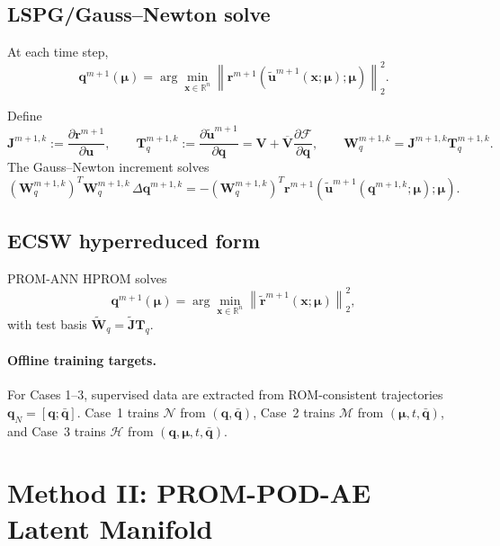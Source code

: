 \documentclass[11pt]{article}
\begin{document}
\subsection{LSPG/Gauss--Newton solve}
At each time step,
\begin{equation}
\mathbf q^{m+1}(\bm\mu)
=
\arg\min_{\mathbf x\in\mathbb R^n}
\left\|
\mathbf r^{m+1}(\tilde{\mathbf u}^{m+1}(\mathbf x;\bm\mu);\bm\mu)
\right\|_2^2.
\label{eq:ann-lspg-min}
\end{equation}

Define
\begin{equation}
\mathbf J^{m+1,k}:=\frac{\partial \mathbf r^{m+1}}{\partial \mathbf u},
\qquad
\mathbf T_q^{m+1,k}:=\frac{\partial \tilde{\mathbf u}^{m+1}}{\partial \mathbf q}
=\mathbf V+\overline{\mathbf V}\frac{\partial\mathcal F}{\partial\mathbf q},
\qquad
\mathbf W_q^{m+1,k}=\mathbf J^{m+1,k}\mathbf T_q^{m+1,k}.
\end{equation}
The Gauss--Newton increment solves
\begin{equation}
(\mathbf W_q^{m+1,k})^T\mathbf W_q^{m+1,k}\,\Delta\mathbf q^{m+1,k}
=
-(\mathbf W_q^{m+1,k})^T
\mathbf r^{m+1}(\tilde{\mathbf u}^{m+1}(\mathbf q^{m+1,k};\bm\mu);\bm\mu).
\end{equation}

\subsection{ECSW hyperreduced form}
PROM-ANN HPROM solves
\begin{equation}
\mathbf q^{m+1}(\bm\mu)
=
\arg\min_{\mathbf x\in\mathbb R^n}
\left\|\widetilde{\mathbf r}^{m+1}(\mathbf x;\bm\mu)\right\|_2^2,
\end{equation}
with test basis $\widetilde{\mathbf W}_q=\widetilde{\mathbf J}\mathbf T_q$.

\paragraph{Offline training targets.}
For Cases 1--3, supervised data are extracted from ROM-consistent trajectories
$\mathbf q_N=[\mathbf q;\bar{\mathbf q}]$. Case~1 trains $\mathcal N$ from
$(\mathbf q,\bar{\mathbf q})$, Case~2 trains $\mathcal M$ from
$(\bm\mu,t,\bar{\mathbf q})$, and Case~3 trains $\mathcal H$ from
$(\mathbf q,\bm\mu,t,\bar{\mathbf q})$.

\section{Method II: PROM-POD-AE Latent Manifold}
\label{sec:method-podae}
\end{document}
